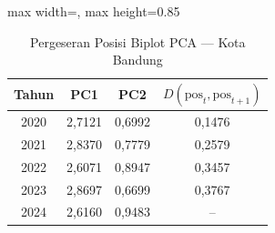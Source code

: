 \begin{table}[H]
\centering
\caption{Pergeseran Posisi Biplot PCA --- Kota Bandung} \label{tab:appjarak_pca_skor_kota_bandung}
\begin{adjustbox}{max width=\textwidth, max height=0.85\textheight}
\begin{tabular}{|c|c|c|c|}
\hline
\textbf{Tahun} & \textbf{PC1} & \textbf{PC2} & \textbf{$D(\text{pos}_t, \text{pos}_{t+1})$} \\
\hline
2020 & 2,7121 & 0,6992 & 0,1476 \\
2021 & 2,8370 & 0,7779 & 0,2579 \\
2022 & 2,6071 & 0,8947 & 0,3457 \\
2023 & 2,8697 & 0,6699 & 0,3767 \\
2024 & 2,6160 & 0,9483 & -- \\
\hline
\end{tabular}
\end{adjustbox}
\end{table}